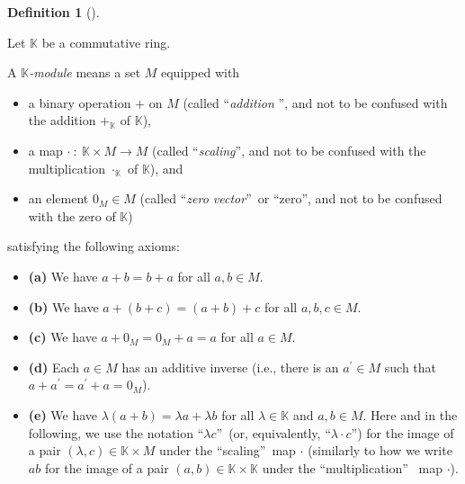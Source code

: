 \documentclass[numbers=enddot,12pt,final,onecolumn,notitlepage]{scrartcl}%
\theoremstyle{definition}
\newtheorem{defi}[theo]{Definition}
\newenvironment{definition}[1][]
{\begin{defi}[#1]\begin{leftbar}}
{\end{leftbar}\end{defi}}
\begin{document}
\begin{definition}
\label{def.module.module}Let $\mathbb{K}$ be a commutative ring.

A $\mathbb{K}$\textit{-module} means a set $M$ equipped with

\begin{itemize}
\item a binary operation $+$ on $M$ (called \textquotedblleft\textit{addition}%
\textquotedblright, and not to be confused with the addition $+_{\mathbb{K}}$
of $\mathbb{K}$),

\item a map $\cdot\ :\ \mathbb{K}\times M\rightarrow M$ (called
\textquotedblleft\textit{scaling}\textquotedblright, and not to be confused
with the multiplication $\cdot_{\mathbb{K}}$ of $\mathbb{K}$), and

\item an element $0_{M}\in M$ (called \textquotedblleft\textit{zero
vector}\textquotedblright\ or \textquotedblleft zero\textquotedblright, and
not to be confused with the zero of $\mathbb{K}$)
\end{itemize}

\noindent satisfying the following axioms:

\begin{itemize}
\item \textbf{(a)} We have $a+b=b+a$ for all $a,b\in M$.

\item \textbf{(b)} We have $a+\left(  b+c\right)  =\left(  a+b\right)  +c$ for
all $a,b,c\in M$.

\item \textbf{(c)} We have $a+0_{M}=0_{M}+a=a$ for all $a\in M$.

\item \textbf{(d)} Each $a\in M$ has an additive inverse (i.e., there is an
$a^{\prime}\in M$ such that $a+a^{\prime}=a^{\prime}+a=0_{M}$).

\item \textbf{(e)} We have $\lambda\left(  a+b\right)  =\lambda a+\lambda b$
for all $\lambda\in\mathbb{K}$ and $a,b\in M$. Here and in the following, we
use the notation \textquotedblleft$\lambda c$\textquotedblright\ (or,
equivalently, \textquotedblleft$\lambda\cdot c$\textquotedblright) for the
image of a pair $\left(  \lambda,c\right)  \in\mathbb{K}\times M$ under the
\textquotedblleft scaling\textquotedblright\ map $\cdot$ (similarly to how we
write $ab$ for the image of a pair $\left(  a,b\right)  \in\mathbb{K}%
\times\mathbb{K}$ under the \textquotedblleft multiplication\textquotedblright%
\ map $\cdot$).


\end{itemize}
\end{definition}
\end{document}

